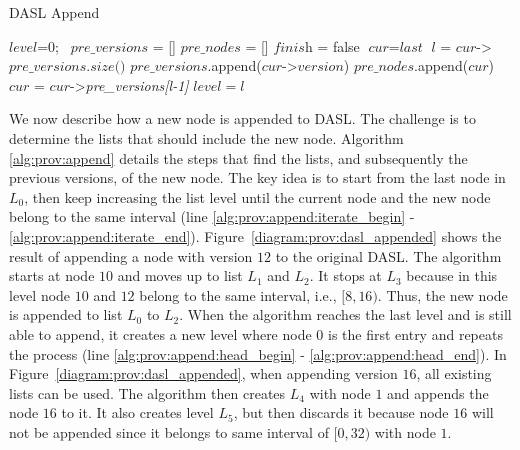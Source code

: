 \begin{algorithm}[t]
  \caption{DASL Append}
  \label{alg:prov:append}
  $\textit{level}$=0;\    
  $\textit{pre\_versions}$ = []\;
  $\textit{pre\_nodes}$ = []\;
  $\textit{finish}$ = false \;
  $\textit{cur} = \textit{last}$ \;
   {
    $l$ = $\textit{cur}$->$\textit{pre\_versions.size()}$ \;
     {
       { \label{alg:prov:append:iterate_begin}
         {
          $\textit{pre\_versions}$.append($\textit{cur}$->$\textit{version}$)\;
          $\textit{pre\_nodes}$.append($\textit{cur}$)\;
        } 
      }
       {
        $\textit{cur}$ = $\textit{cur}$->\textit{pre\_versions[l-1]}\;
        $\textit{level}=l$
      } \label{alg:prov:append:iterate_end}
    } 
  }

\end{algorithm}

We now describe how a new node is appended to DASL. The challenge is to determine the lists that should include the
new node. Algorithm \ref{alg:prov:append} details the steps that find the lists, and subsequently the previous
versions, of the new node. The key idea is to start from the last node in $L_0$, then keep increasing the list
level until the current node and the new node belong to the same interval (line
\ref{alg:prov:append:iterate_begin} - \ref{alg:prov:append:iterate_end}). Figure~\ref{diagram:prov:dasl_appended} shows the result of appending a node with version $12$ to the original DASL. The algorithm starts at node $10$ and moves up to list $L_1$ and $L_2$. It stops at $L_3$ because in this level node $10$ and $12$ belong to the same
interval, i.e., $[8,16)$. Thus, the new node is appended to list $L_0$ to $L_2$. When the algorithm reaches
the last level and is still able to append, it creates a new level where node $0$ is the first entry and
repeats the process (line \ref{alg:prov:append:head_begin} -
\ref{alg:prov:append:head_end}). In Figure~\ref{diagram:prov:dasl_appended}, when appending version $16$, all existing lists can be used. The algorithm then creates $L_4$ with node $1$ and appends the node $16$ to it. It also creates
level $L_5$, but then discards it because node $16$ will not be appended since it belongs to same
interval of $[0,32)$ with node $1$. 

